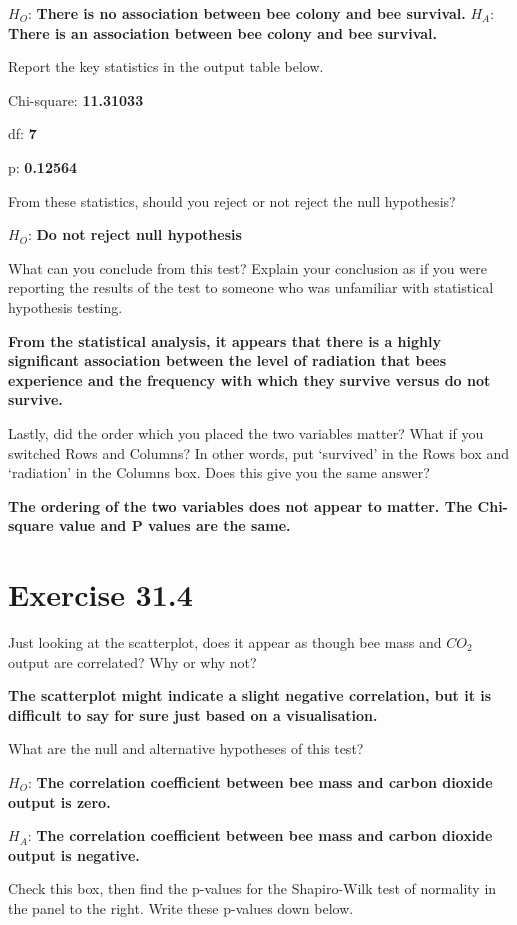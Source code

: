 \documentclass[
  openany]{scrbook}
\begin{document}
\(H_{O}\): \textbf{There is no association between bee colony and bee survival.}
\(H_{A}\): \textbf{There is an association between bee colony and bee survival.}

Report the key statistics in the output table below.

Chi-square: \textbf{11.31033}

df: \textbf{7}

p: \textbf{0.12564}

From these statistics, should you reject or not reject the null hypothesis?

\(H_{O}\): \textbf{Do not reject null hypothesis}

What can you conclude from this test? Explain your conclusion as if you were reporting the results of the test to someone who was unfamiliar with statistical hypothesis testing.

\textbf{From the statistical analysis, it appears that there is a highly significant association between the level of radiation that bees experience and the frequency with which they survive versus do not survive.}

Lastly, did the order which you placed the two variables matter? What if you switched Rows and Columns? In other words, put `survived' in the Rows box and `radiation' in the Columns box. Does this give you the same answer?

\textbf{The ordering of the two variables does not appear to matter. The Chi-square value and P values are the same.}

\hypertarget{exercise-31.4}{%
\section{Exercise 31.4}\label{exercise-31.4}}

Just looking at the scatterplot, does it appear as though bee mass and \(CO_{2}\) output are correlated? Why or why not?

\textbf{The scatterplot might indicate a slight negative correlation, but it is difficult to say for sure just based on a visualisation.}

What are the null and alternative hypotheses of this test?

\(H_{O}\): \textbf{The correlation coefficient between bee mass and carbon dioxide output is zero.}

\(H_{A}\): \textbf{The correlation coefficient between bee mass and carbon dioxide output is negative.}

Check this box, then find the p-values for the Shapiro-Wilk test of normality in the panel to the right. Write these p-values down below.
\end{document}
